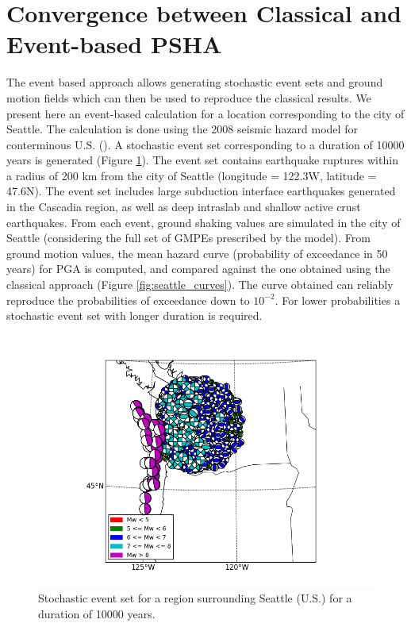 \section{Convergence between Classical and Event-based PSHA}
The event based approach allows generating stochastic event sets and ground motion fields which can then
be used to reproduce the classical results. We present here an event-based calculation for a location corresponding to the city of Seattle. The calculation is done using the 2008 seismic hazard model for conterminous U.S. (\cite{petersen2008}). A stochastic event set corresponding to a duration of 10000
years is generated (Figure \ref{fig:seattle_ses}). The event set contains earthquake ruptures within a radius of
200 km from the city of Seattle (longitude = 122.3W, latitude = 47.6N). The event set includes large subduction interface earthquakes generated in the Cascadia region, as well as deep intraslab and shallow active crust earthquakes. From each event, ground shaking values are simulated in the city of Seattle (considering the full set of GMPEs prescribed by the model). From ground motion values, the mean
hazard curve (probability of exceedance in 50 years) for PGA is computed, and compared against the
one obtained using the classical approach (Figure \ref{fig:seattle_curves}). The curve obtained can reliably
reproduce the probabilities of exceedance down to $10^{-2}$. For lower probabilities a stochastic event
set with longer duration is required.
\begin{figure}
\centering
\includegraphics[width=14cm]{./Pictures/ses_USA_NSHMP2008.png}
\caption{Stochastic event set for a region surrounding Seattle (U.S.) for a duration of 10000 years.}
\label{fig:seattle_ses}
\end{figure}
